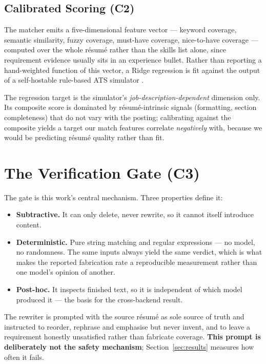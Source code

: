 \documentclass[conference]{IEEEtran}
\begin{document}
\subsection{Calibrated Scoring (C2)}

The matcher emits a five-dimensional feature vector --- keyword coverage,
semantic similarity, fuzzy coverage, must-have coverage, nice-to-have coverage
--- computed over the whole résumé rather than the skills list alone, since
requirement evidence usually sits in an experience bullet. Rather than reporting
a hand-weighted function of this vector, a Ridge regression is fit against the
output of a self-hostable rule-based ATS simulator \cite{atsscreener}.

The regression target is the simulator's \emph{job-description-dependent}
dimension only. Its composite score is dominated by résumé-intrinsic signals
(formatting, section completeness) that do not vary with the posting;
calibrating against the composite yields a target our match features correlate
\emph{negatively} with, because we would be predicting résumé quality rather
than fit.

\section{The Verification Gate (C3)}

The gate is this work's central mechanism. Three properties define it:

\begin{itemize}
  \item \textbf{Subtractive.} It can only delete, never rewrite, so it cannot
    itself introduce content.
  \item \textbf{Deterministic.} Pure string matching and regular expressions
    --- no model, no randomness. The same inputs always yield the same verdict,
    which is what makes the reported fabrication rate a reproducible measurement
    rather than one model's opinion of another.
  \item \textbf{Post-hoc.} It inspects finished text, so it is independent of
    which model produced it --- the basis for the cross-backend result.
\end{itemize}

The rewriter is prompted with the source résumé as sole source of truth and
instructed to reorder, rephrase and emphasise but never invent, and to leave a
requirement honestly unsatisfied rather than fabricate coverage.
\textbf{This prompt is deliberately not the safety mechanism};
Section~\ref{sec:results} measures how often it fails.
\end{document}
